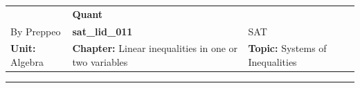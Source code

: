 \documentclass[11pt,paper=a4,answers]{exam}
\begin{document}
\begin{center}
    \centering
    \renewcommand{\arraystretch}{1.5}
    \begin{tabularx}{\textwidth}{YYY}
    & \normalsize\bf{{\Large{{Quant}}}} & \\
    By Preppeo & \normalsize\bf{{sat\_lid\_011}} & SAT\\
    \normalsize{{\textbf{{Unit:}} Algebra}} & \normalsize{{\textbf{{Chapter:}} Linear inequalities in one or two variables}} & \normalsize{{\textbf{{Topic:}} Systems of Inequalities}} \\
    \end{tabularx}
\end{center}
\par\noindent\rule{\textwidth}{1pt}
\end{document}
